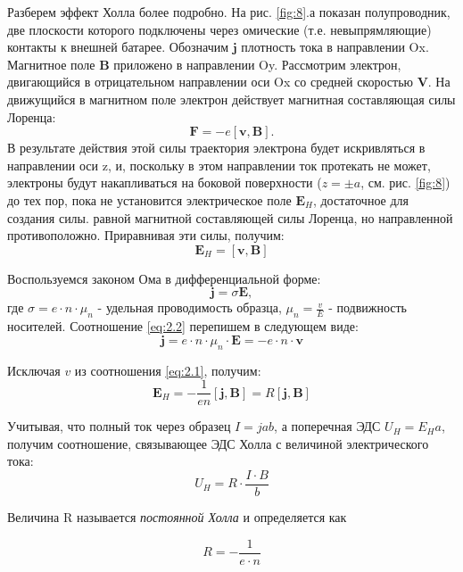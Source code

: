\documentclass[a4paper,14pt]{extarticle}
\renewcommand{\vec}{\mathbf} %
\begin{document}
Разберем эффект Холла более подробно. На рис. \ref{fig:8}.а показан полупроводник, две плоскости которого подключены через омические (т.е. невыпрямляющие) контакты к внешней батарее. Обозначим $\vec{j}$ плотность тока в направлении Ox. Магнитное поле $\vec{B}$ приложено в направлении Oy. Рассмотрим электрон, двигающийся в отрицательном направлении оси Ox со средней скоростью $\vec{V}$. На движущийся в магнитном поле электрон действует магнитная составляющая силы Лоренца:
$$\vec{F} = -e [\vec{v}, \vec{B}].$$
В результате действия этой силы траектория электрона будет искривляться  в направлении оси z, и, поскольку в этом направлении ток протекать не может, электроны будут накапливаться на боковой поверхности ($z=\pm a$, см. рис. \ref{fig:8}) до тех пор, пока не установится электрическое поле $\vec{E}_H$, достаточное для создания силы. равной магнитной составляющей силы Лоренца, но направленной противоположно. Приравнивая эти силы, получим: 
\begin{equation}
\label{eq:2.1}
	\vec{E}_H=[\vec{v}, \vec{B}]
\end{equation}

Воспользуемся законом Ома в дифференциальной форме:
\begin{equation}
\label{eq:2.2}
	\vec{j} = \sigma \vec{E},
\end{equation}
где $\sigma = e \cdot n \cdot \mu_n$ - удельная проводимость образца, $\mu_n = \frac{v}{E}$ - подвижность носителей. Соотношение \eqref{eq:2.2} перепишем в следующем виде:
\begin{equation}
\label{eq:2.3}
	\vec{j} = e \cdot n \cdot \mu_n \cdot \vec{E} = -e \cdot n \cdot \vec{v}
\end{equation}

Исключая $v$ из соотношения \eqref{eq:2.1}, получим:
\begin{equation}
\label{eq:2.4}
	\vec{E}_H = -\frac{1}{en} [\vec{j}, \vec{B}]=R[\vec{j}, \vec{B}]
\end{equation}

Учитывая, что полный ток через образец $I=jab$, а поперечная ЭДС $U_H=E_Ha$, получим соотношение, связывающее ЭДС Холла с величиной электрического тока:
\begin{equation}
\label{eq:2.5}
	U_H=R \cdot \frac{I\cdot B}{b}
\end{equation}

Величина R называется \textit{постоянной Холла} и определяется как

\begin{equation}
\label{eq:2.6}
	R=-\frac{1}{e\cdot n}
\end{equation}
\end{document}
